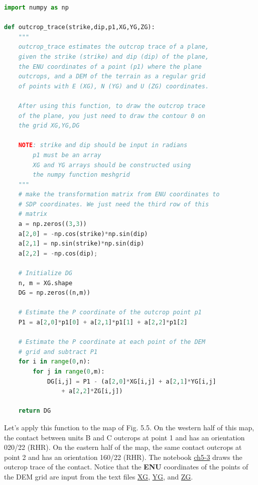 \documentclass[a4paper , 12pt]{book}
\begin{document}
\begin{center}
\begin{lstlisting}[language=Python, frame=single]
import numpy as np

def outcrop_trace(strike,dip,p1,XG,YG,ZG):
	"""
	outcrop_trace estimates the outcrop trace of a plane,
	given the strike (strike) and dip (dip) of the plane,
	the ENU coordinates of a point (p1) where the plane
	outcrops, and a DEM of the terrain as a regular grid
	of points with E (XG), N (YG) and U (ZG) coordinates.
	
	After using this function, to draw the outcrop trace
	of the plane, you just need to draw the contour 0 on
	the grid XG,YG,DG
	
	NOTE: strike and dip should be input in radians
		p1 must be an array
		XG and YG arrays should be constructed using
		the numpy function meshgrid
	"""
	# make the transformation matrix from ENU coordinates to
	# SDP coordinates. We just need the third row of this
	# matrix
	a = np.zeros((3,3))
	a[2,0] = -np.cos(strike)*np.sin(dip) 
	a[2,1] = np.sin(strike)*np.sin(dip) 
	a[2,2] = -np.cos(dip);
	
	# Initialize DG
	n, m = XG.shape
	DG = np.zeros((n,m))
	
	# Estimate the P coordinate of the outcrop point p1
	P1 = a[2,0]*p1[0] + a[2,1]*p1[1] + a[2,2]*p1[2]
	
	# Estimate the P coordinate at each point of the DEM
	# grid and subtract P1
	for i in range(0,n):
		for j in range(0,m):
			DG[i,j] = P1 - (a[2,0]*XG[i,j] + a[2,1]*YG[i,j] 
				+ a[2,2]*ZG[i,j])
	
	return DG
\end{lstlisting}
\end{center}

Let's apply this function to the map of Fig. 5.5. On the western half of this map, the contact between units B and C outcrops at point 1 and has an orientation 020/22 (RHR). On the eastern half of the map, the same contact outcrops at point 2 and has an orientation 160/22 (RHR). The notebook \href{https://github.com/nfcd/compGeo/blob/master/source/notebooks/ch5-3.ipynb}{ch5-3} draws the outcrop trace of the contact. Notice that the \textbf{ENU} coordinates of the points of the DEM grid are input from the text files \href{https://github.com/nfcd/compGeo/blob/master/source/data/ch5-3/XG.txt}{XG}, \href{https://github.com/nfcd/compGeo/blob/master/source/data/ch5-3/YG.txt}{YG}, and \href{https://github.com/nfcd/compGeo/blob/master/source/data/ch5-3/ZG.txt}{ZG}.
\end{document}
